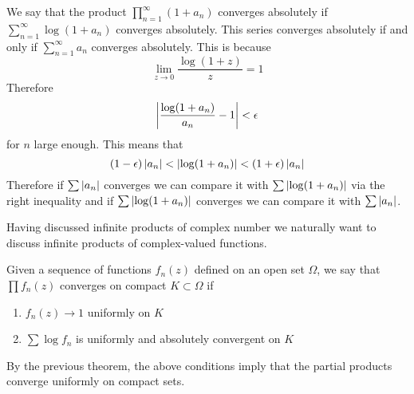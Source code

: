 We say that the product $\prod_{n = 1}^\infty (1 + a_n)$ converges absolutely if $\sum_{n = 1}^\infty \log(1 + a_n)$ converges absolutely. This series converges absolutely if and only if $\sum_{n =1}^\infty a_n$ converges absolutely. This is because 
$$\lim_{z \to 0} \frac{\log(1 + z)}{z} = 1$$
Therefore 
$$\left| \frac{\log(1 + a_n)}{a_n} - 1\right| < \epsilon$$
for $n$ large enough. This means that
$$(1 - \epsilon) \left|a_n\right| < \left|\log(1 + a_n)\right| < (1 + \epsilon) \left|a_n\right|$$
Therefore if $\sum \left|a_n\right|$ converges we can compare it with $\sum \left|\log(1 + a_n)\right|$ via the right inequality and if $\sum \left|\log(1 + a_n)\right|$ converges we can compare it with $\sum \left|a_n\right|$.

\secbreak

Having discussed infinite products of complex number we naturally want to discuss infinite products of complex-valued functions. 
\begin{definition}
    Given a sequence of functions $f_n(z)$ defined on an open set $\Omega$, we say that $\prod f_n(z)$ converges on compact $K \subset \Omega$ if 
    \begin{enumerate}
        \item $f_n(z) \to 1$ uniformly on $K$
        \item $\sum \log f_n$ is uniformly and absolutely convergent on $K$
    \end{enumerate}
\end{definition}
By the previous theorem, the above conditions imply that the partial products converge uniformly on compact sets. 

